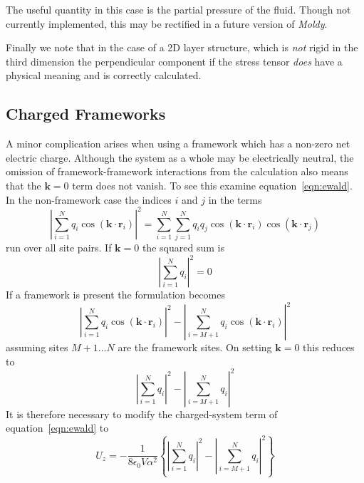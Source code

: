 \documentclass[a4paper,twoside]{report}
\newcommand{\bm}[1]{\mathbf{#1}}
\newcommand{\moldy}{\emph{Moldy}}
\begin{document}
The useful quantity in this case is the partial pressure of the
fluid.  Though not currently implemented, this may be rectified in a
future version of \moldy.

Finally we note that in the case of a 2D layer structure, which is
\emph{not} rigid in the third dimension the perpendicular component if
the stress tensor \emph{does} have a physical meaning and is correctly
calculated. 
 
\subsection{Charged Frameworks}
A minor complication arises when using a framework which has a
non-zero net electric charge.  Although the system as a whole may be
electrically neutral, the omission of  framework-framework
interactions from the calculation also means that the
$\bm{k}=0$ term does not vanish.  To see this examine
equation~\ref{eqn:ewald}.  In the non-framework case the indices $i$
and $j$ in the terms
\begin{displaymath}
\left | \sum_{i=1}^{N} q_i \cos(\bm{k \cdot r}_i) \right |^2 
  = \sum_{i=1}^{N} \sum_{j=1}^{N} q_i q_j 
    \cos(\bm{k \cdot r}_i)\cos(\bm{k \cdot r}_j) 
\end{displaymath}
run over all site pairs.  If $\bm{k}=0$
the squared sum is 
\begin{displaymath}
\left | \sum_{i=1}^{N} q_i \right |^2 = 0
\end{displaymath}
If a framework is present the formulation becomes
\begin{displaymath}
\left | \sum_{i=1}^{N} q_i \cos(\bm{k \cdot r}_i) \right |^2 
-
\left | \sum_{i=M\!+\!1}^{N} q_i \cos(\bm{k \cdot r}_i) \right |^2 
\end{displaymath}
assuming sites $M+1 \ldots N$ are the framework sites.  On setting
$\bm{k}=0$ this reduces to
\begin{displaymath}
\left | \sum_{i=1}^N q_i \right |^2 - \left | \sum_{i=M\!+\!1}^N q_i \right |^2
\end{displaymath}
It is therefore necessary to modify the charged-system term of
equation~\ref{eqn:ewald} to
\begin{equation}
U_z = - \frac{1}{8 \epsilon_0 V \alpha^2}
\left \lbrace
\left | \sum_{i=1}^N q_i \right |^2 - \left | \sum_{i=M\!+\!1}^N q_i \right |^2
\right \rbrace
\end{equation}
\end{document}
